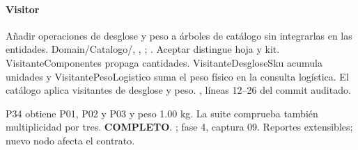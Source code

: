 \paragraph{Visitor}
 Añadir operaciones de desglose y peso a árboles de catálogo sin integrarlas en las entidades.
 Domain/Catalogo/, , ; . Aceptar distingue hoja y kit. VisitanteComponentes propaga cantidades. VisitanteDesgloseSku acumula unidades y VisitantePesoLogistico suma el peso físico en la consulta logística.
 El catálogo aplica visitantes de desglose y peso.
 , líneas 12--26 del commit auditado.

 P34 obtiene P01, P02 y P03 y peso 1.00 kg. La suite comprueba también multiplicidad por tres. \textbf{COMPLETO}.
 ; fase 4, captura 09.
 Reportes extensibles; nuevo nodo afecta el contrato.
\medskip


